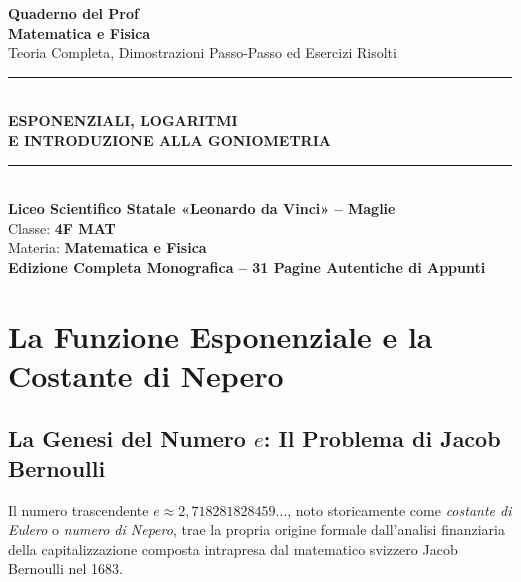 \documentclass[11pt,a4paper,oneside]{report}
\begin{document}
\begin{titlepage}
    \centering
    \vspace*{2.0cm}
    
    {\fontsize{34}{42}\selectfont\sffamily\bfseries\color{primaryBlue} Quaderno del Prof}\\[0.6cm]
    {\Large\sffamily\bfseries\color{accentTeal} Matematica e Fisica}\\[0.3cm]
    {\large\sffamily\color{methodSlate} Teoria Completa, Dimostrazioni Passo-Passo ed Esercizi Risolti}\\[1.5cm]
    
    \rule{0.85\linewidth}{1.5pt}\\[1.8cm]
    
    {\huge\sffamily\bfseries ESPONENZIALI, LOGARITMI\\ E INTRODUZIONE ALLA GONIOMETRIA}\\[1.8cm]
    
    \rule{0.85\linewidth}{1.5pt}\\[2.5cm]
    
    {\Large\sffamily
    \textbf{Liceo Scientifico Statale «Leonardo da Vinci» -- Maglie}\\[0.3cm]
    Classe: \textbf{4F MAT}\\[0.2cm]
    Materia: \textbf{Matematica e Fisica}\\[0.4cm]
    \large\color{primaryBlue}\textbf{Edizione Completa Monografica -- 31 Pagine Autentiche di Appunti}
    }
    
    \vfill
\end{titlepage}

\tableofcontents
\newpage

\chapter{La Funzione Esponenziale e la Costante di Nepero}

\section{La Genesi del Numero $e$: Il Problema di Jacob Bernoulli}
Il numero trascendente $e \approx 2{,}718281828459\dots$, noto storicamente come \emph{costante di Eulero} o \emph{numero di Nepero}, trae la propria origine formale dall'analisi finanziaria della capitalizzazione composta intrapresa dal matematico svizzero Jacob Bernoulli nel 1683.
\end{document}
